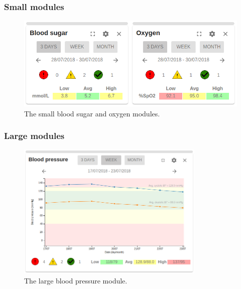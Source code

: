     \subsubsection{Small modules}

    \begin{figure}[!htb]
        \centering
        \includegraphics[width=1\textwidth]{screenshots/bs_ox_small}
        \caption{The small blood sugar and oxygen modules.}\label{fig:screen_bs_ox_small}
    \end{figure}

    \clearpage
    \subsubsection{Large modules}

    \begin{figure}[!htb]
        \centering
        \includegraphics[width=0.8\textwidth]{screenshots/bp_large}
        \caption{The large blood pressure module.}\label{fig:screen_bp_large}
    \end{figure}

